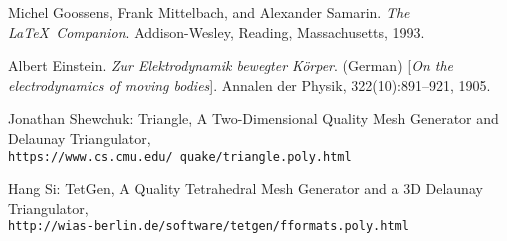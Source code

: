 
\newpage

\begin{thebibliography}{9}

Michel Goossens, Frank Mittelbach, and Alexander Samarin. 
\textit{The \LaTeX\ Companion}. 
Addison-Wesley, Reading, Massachusetts, 1993.

Albert Einstein. 
\textit{Zur Elektrodynamik bewegter K{\"o}rper}. (German) [\textit{On the electrodynamics of moving bodies}]. 
Annalen der Physik, 322(10):891–921, 1905.

Jonathan Shewchuk: Triangle, A Two-Dimensional Quality Mesh Generator and Delaunay Triangulator,
\\\texttt{https://www.cs.cmu.edu/~quake/triangle.poly.html}

Hang Si: TetGen, A Quality Tetrahedral Mesh Generator and a 3D Delaunay Triangulator,
\\\texttt{http://wias-berlin.de/software/tetgen/fformats.poly.html}

\end{thebibliography}
